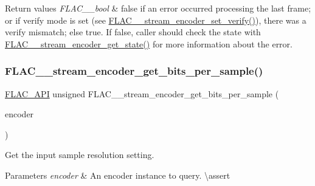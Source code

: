 \begin{DoxyRetVals}{Return values}
{\em F\+L\+A\+C\+\_\+\+\_\+bool} & {\ttfamily false} if an error occurred processing the last frame; or if verify mode is set (see \mbox{\hyperlink{group__flac__stream__encoder_ga5f4ac18a7207d2864fed72d284486f9e}{F\+L\+A\+C\+\_\+\+\_\+stream\+\_\+encoder\+\_\+set\+\_\+verify()}}), there was a verify mismatch; else {\ttfamily true}. If {\ttfamily false}, caller should check the state with \mbox{\hyperlink{group__flac__stream__encoder_gaff7284e55f01b59ed8f03317df510992}{F\+L\+A\+C\+\_\+\+\_\+stream\+\_\+encoder\+\_\+get\+\_\+state()}} for more information about the error. \\
\hline
\end{DoxyRetVals}
\mbox{\label{group__flac__stream__encoder_gacbd84a241c6718ed4c2688fd558efdcd}} 
\subsubsection{\texorpdfstring{FLAC\_\_stream\_encoder\_get\_bits\_per\_sample()}{FLAC\_\_stream\_encoder\_get\_bits\_per\_sample()}}
{\footnotesize\ttfamily \mbox{\hyperlink{group__flac__export_ga56ca07df8a23310707732b1c0007d6f5}{F\+L\+A\+C\+\_\+\+A\+PI}} unsigned F\+L\+A\+C\+\_\+\+\_\+stream\+\_\+encoder\+\_\+get\+\_\+bits\+\_\+per\+\_\+sample (\begin{DoxyParamCaption}\item[{const \mbox{\hyperlink{struct_f_l_a_c_____stream_encoder}{F\+L\+A\+C\+\_\+\+\_\+\+Stream\+Encoder}} $\ast$}]{encoder }\end{DoxyParamCaption})}

Get the input sample resolution setting.


\begin{DoxyParams}{Parameters}
{\em encoder} & An encoder instance to query. \textbackslash{}assert 
\begin{DoxyCode}{1}
\end{DoxyCode}
 \\
\hline
\end{DoxyParams}

